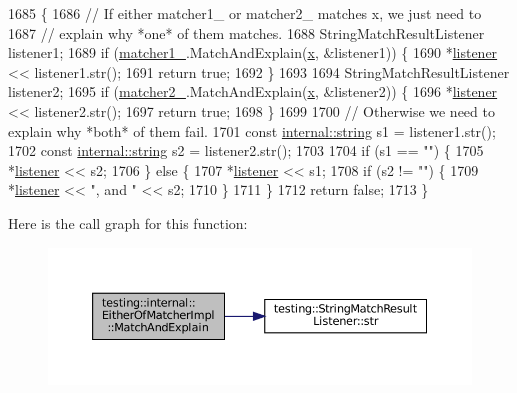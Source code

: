\begin{DoxyCode}
1685                                                                          \{
1686     \textcolor{comment}{// If either matcher1\_ or matcher2\_ matches x, we just need to}
1687     \textcolor{comment}{// explain why *one* of them matches.}
1688     StringMatchResultListener listener1;
1689     \textcolor{keywordflow}{if} (\hyperlink{classtesting_1_1internal_1_1EitherOfMatcherImpl_ae4ac9a56093a18b90168cc6f8a3be9d3}{matcher1\_}.MatchAndExplain(\hyperlink{namespaceinteractive__marker_acda52804aef30b460a72fb21ee01d69d}{x}, &listener1)) \{
1690       *\hyperlink{namespaceinteractive__marker_a0e579ab555212bb5e2c9f8a675b7618a}{listener} << listener1.str();
1691       \textcolor{keywordflow}{return} \textcolor{keyword}{true};
1692     \}
1693 
1694     StringMatchResultListener listener2;
1695     \textcolor{keywordflow}{if} (\hyperlink{classtesting_1_1internal_1_1EitherOfMatcherImpl_a73b3d0e53d7bca7ffb324d3a904eb62f}{matcher2\_}.MatchAndExplain(\hyperlink{namespaceinteractive__marker_acda52804aef30b460a72fb21ee01d69d}{x}, &listener2)) \{
1696       *\hyperlink{namespaceinteractive__marker_a0e579ab555212bb5e2c9f8a675b7618a}{listener} << listener2.str();
1697       \textcolor{keywordflow}{return} \textcolor{keyword}{true};
1698     \}
1699 
1700     \textcolor{comment}{// Otherwise we need to explain why *both* of them fail.}
1701     \textcolor{keyword}{const} \hyperlink{namespacetesting_1_1internal_a8e8ff5b11e64078831112677156cb111}{internal::string} s1 = listener1.str();
1702     \textcolor{keyword}{const} \hyperlink{namespacetesting_1_1internal_a8e8ff5b11e64078831112677156cb111}{internal::string} s2 = listener2.str();
1703 
1704     \textcolor{keywordflow}{if} (s1 == \textcolor{stringliteral}{""}) \{
1705       *\hyperlink{namespaceinteractive__marker_a0e579ab555212bb5e2c9f8a675b7618a}{listener} << s2;
1706     \} \textcolor{keywordflow}{else} \{
1707       *\hyperlink{namespaceinteractive__marker_a0e579ab555212bb5e2c9f8a675b7618a}{listener} << s1;
1708       \textcolor{keywordflow}{if} (s2 != \textcolor{stringliteral}{""}) \{
1709         *\hyperlink{namespaceinteractive__marker_a0e579ab555212bb5e2c9f8a675b7618a}{listener} << \textcolor{stringliteral}{", and "} << s2;
1710       \}
1711     \}
1712     \textcolor{keywordflow}{return} \textcolor{keyword}{false};
1713   \}
\end{DoxyCode}
Here is the call graph for this function\+:
\nopagebreak
\begin{figure}[H]
\begin{center}
\leavevmode
\includegraphics[width=350pt]{classtesting_1_1internal_1_1EitherOfMatcherImpl_af00ed8cd85c36f1e862bf85f776cee3b_cgraph}
\end{center}
\end{figure}


